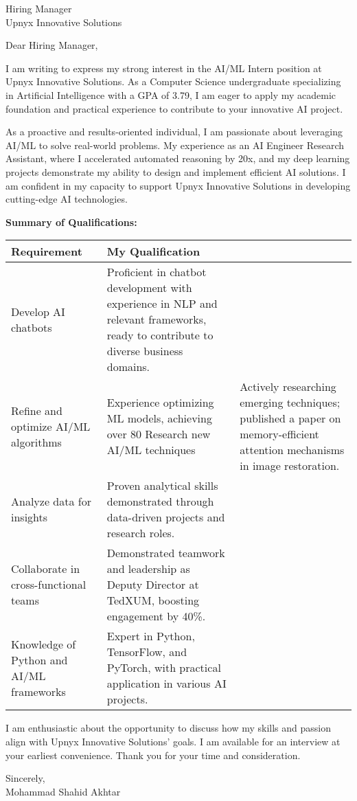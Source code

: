 \documentclass[10.5pt]{letter}
\date{\today}
\begin{document}
\begin{letter}{Hiring Manager\\Upnyx Innovative Solutions}

\opening{Dear Hiring Manager,}

I am writing to express my strong interest in the AI/ML Intern position at Upnyx Innovative Solutions. As a Computer Science undergraduate specializing in Artificial Intelligence with a GPA of 3.79, I am eager to apply my academic foundation and practical experience to contribute to your innovative AI project.

As a proactive and results-oriented individual, I am passionate about leveraging AI/ML to solve real-world problems. My experience as an AI Engineer Research Assistant, where I accelerated automated reasoning by 20x, and my deep learning projects demonstrate my ability to design and implement efficient AI solutions. I am confident in my capacity to support Upnyx Innovative Solutions in developing cutting-edge AI technologies.

\vspace{0.2cm}
\textbf{Summary of Qualifications:}
\vspace{0.1cm}

\renewcommand{\arraystretch}{1.3}
\begin{tabularx}{\textwidth}{@{}p{}X@{}}
\textbf{Requirement} & \textbf{My Qualification} \\
\hline
Develop AI chatbots & Proficient in chatbot development with experience in NLP and relevant frameworks, ready to contribute to diverse business domains. \\
Refine and optimize AI/ML algorithms & Experience optimizing ML models, achieving over 80%
Research new AI/ML techniques & Actively researching emerging techniques; published a paper on memory-efficient attention mechanisms in image restoration. \\
Analyze data for insights & Proven analytical skills demonstrated through data-driven projects and research roles. \\
Collaborate in cross-functional teams & Demonstrated teamwork and leadership as Deputy Director at TedXUM, boosting engagement by 40\%. \\
Knowledge of Python and AI/ML frameworks & Expert in Python, TensorFlow, and PyTorch, with practical application in various AI projects. \\
\end{tabularx}

\vspace{0.4cm}
I am enthusiastic about the opportunity to discuss how my skills and passion align with Upnyx Innovative Solutions' goals.  I am available for an interview at your earliest convenience. Thank you for your time and consideration.

\vspace{0.4cm}
\begin{flushleft}
Sincerely,\\[1.5ex]
Mohammad Shahid Akhtar
\end{flushleft}

\end{letter}
\end{document}
